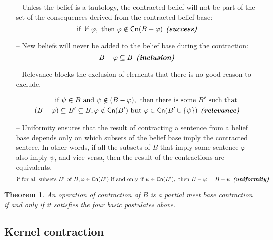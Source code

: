 \begin{enumerate}
    \item [--] Unless the belief is a tautology, the contracted belief will not be part of the set of the consequences derived from the contracted belief base:
    $$\text{if } \nvdash \varphi, \text{ then } \varphi \notin \textsf{Cn}(B - \varphi) \textbf{\textit{ (success)}}$$

    \item [--] New beliefs will never be added to the belief base during the contraction:
    $$B - \varphi \subseteq B \textbf{\textit{ (inclusion)}}$$

    \item [--] Relevance blocks the exclusion of elements that there is no good reason to exclude.
    
    \begin{equation*}
        \begin{split}
            \text{if } \psi \in B \text{ and } \psi \notin  (B - \varphi), \text{ then there is some } B' \text{ such that }  \\
                (B - \varphi) \subseteq B' \subseteq B, \varphi \notin \textsf{Cn}(B') \text{ but } \varphi \in \textsf{Cn}(B' \cup \{ \psi \})  \textbf{\textit{ (relevance)}}
        \end{split}
    \end{equation*}

    \item [--] Uniformity ensures that the result of contracting a sentence from a belief base depends only on which subsets of the belief base imply the contracted sentece. In other words, if all the subsets of $B$ that imply some sentence $\varphi$ also imply $\psi$, and vice versa, then the result of the contractions are equivalents.
    $$\text{if for all subsets } B' \text{ of } B, \varphi \in \textsf{Cn}(B') \text{ if and only if } \psi \in \textsf{Cn}(B'), \text{ then } B - \varphi = B - \psi \textbf{\textit{ (uniformity)}}$$

\end{enumerate}

\newtheorem{theorem}{Theorem}[chapter]

\begin{theorem}
    An operation of contraction of $B$ is a \textit{partial meet base contraction} if and only if it satisfies the four basic postulates above.    
\end{theorem}

\subsection{Kernel contraction}

